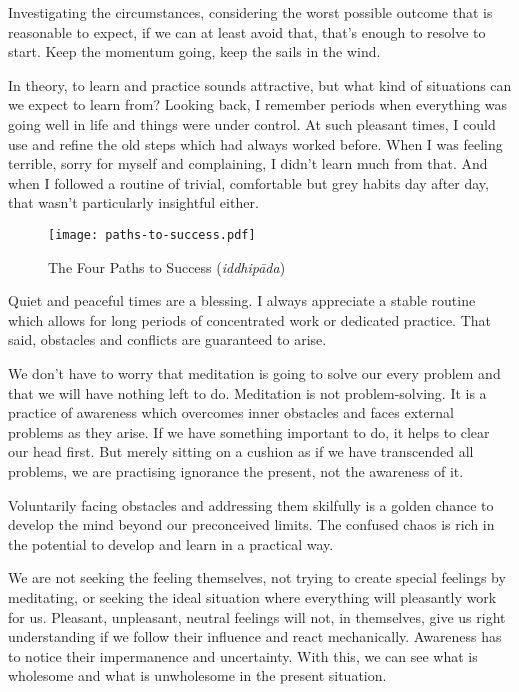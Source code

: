 Investigating the circumstances, considering the worst possible outcome
that is reasonable to expect, if we can at least avoid that, that's
enough to resolve to start. Keep the momentum going, keep the sails in
the wind.

In theory, to learn and practice sounds attractive, but what kind of
situations can we expect to learn from? Looking back, I remember periods
when everything was going well in life and things were under control. At
such pleasant times, I could use and refine the old steps which had
always worked before. When I was feeling terrible, sorry for myself and
complaining, I didn't learn much from that. And when I followed a
routine of trivial, comfortable but grey habits day after day, that
wasn't particularly insightful either.

\clearpage
\null\vfill

\begin{figure}[h]
\caption{The Four Paths to Success (\emph{iddhipāda})}\label{fig-success}

\centering

\texttt{[image: paths-to-success.pdf]}

\end{figure}

\vfill\null
\clearpage

Quiet and peaceful times are a blessing. I always appreciate a stable
routine which allows for long periods of concentrated work or dedicated
practice. That said, obstacles and conflicts are guaranteed to arise.

We don't have to worry that meditation is going to solve our every
problem and that we will have nothing left to do. Meditation is not
problem-solving. It is a practice of awareness which overcomes inner
obstacles and faces external problems as they arise. If we have
something important to do, it helps to clear our head first. But merely
sitting on a cushion as if we have transcended all problems, we are
practising ignorance the present, not the awareness of it.

Voluntarily facing obstacles and addressing them skilfully is a golden
chance to develop the mind beyond our preconceived limits. The confused
chaos is rich in the potential to develop and learn in a practical way.

We are not seeking the feeling themselves, not trying to create special
feelings by meditating, or seeking the ideal situation where everything
will pleasantly work for us. Pleasant, unpleasant, neutral feelings will
not, in themselves, give us right understanding if we follow their
influence and react mechanically. Awareness has to notice their
impermanence and uncertainty. With this, we can see what is wholesome
and what is unwholesome in the present situation.

